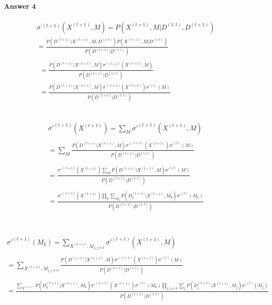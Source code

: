 \documentclass[12pt]{article}
\begin{document}
\paragraph{Answer 4}

\[\begin{array}{*{20}{c}}
   {{\sigma ^{'(t + 1)}}({X^{(t + 1)}},M) = P({X^{(t + 1)}},M|{D^{(1:t)}},{D^{(t + 1)}})}  \\
   { = \frac{{P({D^{(t + 1)}}|{X^{(t + 1)}},M,{D^{(1:t)}})P({X^{(t + 1)}},M|{D^{(1:t)}})}}{{P({D^{(t + 1)}}|{D^{(1:t)}})}}}  \\
   \begin{array}{l}
  = \frac{{P({D^{(t + 1)}}|{X^{(t + 1)}},M){\sigma ^{'(\cdot t + 1)}}({X^{(t + 1)}},M)}}{{P({D^{(t + 1)}}|{D^{(1:t)}})}} \\ 
  = \frac{{P({D^{(t + 1)}}|{X^{(t + 1)}},M){\sigma ^{'(.t + 1)}}({X^{(t + 1)}}){\sigma ^{'(t)}}(M)}}{{P({D^{(t + 1)}}|{D^{(1:t)}})}} \\ 
 \end{array}  \\
\end{array}\]
\\

\[\begin{array}{l}
 \sigma {'^{(t + 1)}}({X^{(t + 1)}}) = \sum\nolimits_M {\sigma {'^{(t + 1)}}({X^{(t + 1)}},M)}  \\ \\
  = \sum\limits_M {\frac{{P({D^{(t + 1)}}|{X^{(t + 1)}},M)\sigma {'^{(.t + 1)}}({X^{(t + 1)}})\sigma {'^{(t)}}(M)}}{{P({D^{(t + 1)}}|{D^{(1:t)}})}}}  \\ \\
  = \frac{{\sigma {'^{(.t + 1)}}({X^{(t + 1)}})\sum\limits_M {P({D^{(t + 1)}}|{X^{(t + 1)}},M)\sigma {'^{(t)}}(M)} }}{{P({D^{(t + 1)}}|{D^{(1:t)}})}} \\ \\
  = \frac{{\sigma {'^{(.t + 1)}}({X^{(t + 1)}})\prod\limits_k {\sum\limits_{{M_k}} {P({D^{(t + 1)}_{k}}|{X^{(t + 1)}},{M_k})\sigma {'^{(t)}}({M_k})} } }}{{P({D^{(t + 1)}}|{D^{(1:t)}})}} \\ 
 \end{array}\]
 \\
 \\
 
 \[\begin{array}{l}
 \sigma {'^{(t + 1)}}({M_k}) = \sum\nolimits_{{X^{(t + 1)}},{M_{j,j \ne k}}} {\sigma {'^{(t + 1)}}({X^{(t + 1)}},M)}  \\ \\
  = \sum\limits_{{X^{(t + 1)}},{M_{j,j \ne k}}} {\frac{{P({D^{(t + 1)}}|{X^{(t + 1)}},M)\sigma {'^{(.t + 1)}}({X^{(t + 1)}})\sigma {'^{(t)}}(M)}}{{P({D^{(t + 1)}}|{D^{(1:t)}})}}}  \\ \\
  = \frac{{\sum\limits_{{X^{(t + 1)}}} {P({D^{(t + 1)}_{k}}|{X^{(t + 1)}},{M_k})\sigma {'^{(.t + 1)}}({X^{(t + 1)}})} \sigma {'^{(t)}}({M_k})\prod\limits_{j,j \ne k} {\sum\limits_j {P({D^{(t + 1)}_{j}}|{X^{(t + 1)}},{M_j})\sigma {'^{(t)}}({M_j})} } }}{{P({D^{(t + 1)}}|{D^{(1:t)}})}} \\ \\
 \end{array}\]
\end{document}
